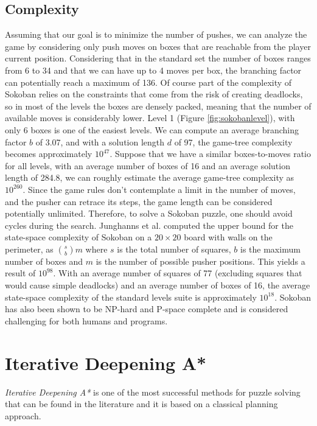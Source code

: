 \subsection{Complexity}
Assuming that our goal is to minimize the number of pushes, we can analyze the game by considering only push moves on boxes that are reachable from the player current position. Considering that in the standard set the number of boxes ranges from 6 to 34 and that we can have up to 4 moves per box, the branching factor can potentially reach a maximum of 136. Of course part of the complexity of Sokoban relies on the constraints that come from the risk of creating deadlocks, so in most of the levels the boxes are densely packed, meaning that the number of available moves is considerably lower. Level 1 (Figure \ref{fig:sokobanlevel}), with only 6 boxes is one of the easiest levels. We can compute an average branching factor $b$ of 3.07, and with a solution length $d$ of 97, the game-tree complexity becomes approximately $10^{47}$. Suppose that we have a similar boxes-to-moves ratio for all levels, with an average number of boxes of 16 and an average solution length of 284.8, we can roughly estimate the average game-tree complexity as $10^{260}$. Since the game rules don't contemplate a limit in the number of moves, and the pusher can retrace its steps, the game length can be considered potentially unlimited. Therefore, to solve a Sokoban puzzle, one should avoid cycles during the search. Junghanns et al. \cite{Junghanns99pushingthe} computed the upper bound for the state-space complexity of Sokoban on a $20\times 20$ board with walls on the perimeter, as $\binom{s}{b}m$ where $s$ is the total number of squares, $b$ is the maximum number of boxes and $m$ is the number of possible pusher positions. This yields a result of $10^{98}$. With an average number of squares of 77 (excluding squares that would cause simple deadlocks) and an average number of boxes of 16, the average state-space complexity of the standard levels suite is approximately $10^{18}$. Sokoban has also been shown to be NP-hard and P-space complete \cite{Pspace-complete97sokobanis} and is considered challenging for both humans and programs.

\section{Iterative Deepening A*}
\textit{Iterative Deepening A*} is one of the most successful methods for puzzle solving that can be found in the literature and it is based on a classical planning approach.

